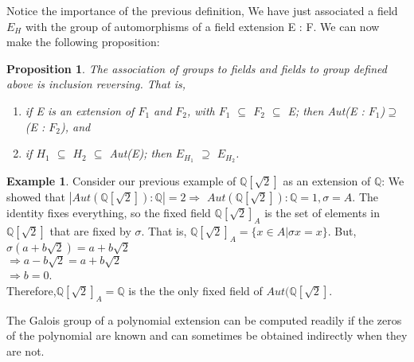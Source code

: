 \documentclass[12pt]{article}
\newtheorem{prop}[thm]{Proposition}
\theoremstyle{definition}
\newtheorem{exmp}[thm]{Example}
\theoremstyle{remark}
\begin{document}
Notice the importance of the previous definition, We have just associated a field $E_{H}$ with the group of automorphisms of a field extension E : F. We can now make the following proposition:

\begin{prop}
The association of groups to fields and fields to group defined above is inclusion reversing.
That is,
\begin{enumerate}
\item if E is an extension of $F_{1}$ and $F_{2}$, with $F_{1}$ $\subseteq$ $F_{2}$ $\subseteq$ E; then Aut(E : $F_{1}$)$\supseteq$(E : $F_{2}$), and
 \item if $H_{1}$ $\subseteq$ $H_{2}$ $\subseteq$ Aut(E); then $E_{H_{1}}$ $\supseteq$ $E_{H_{2}}$.
\end{enumerate}
\end{prop}

\begin{exmp}
Consider our previous example of $\mathbb{Q}[\sqrt{2}]$ as an extension of $\mathbb{Q}$: We showed that $|Aut(\mathbb{Q}[\sqrt{2}]):\mathbb{Q}|=2 \Rightarrow$ $Aut(\mathbb{Q}[\sqrt{2}]):\mathbb{Q}={1,\sigma}=A$.  The identity fixes everything, so the fixed field $\mathbb{Q}[\sqrt{2}]_{A}$ is the set of elements in $\mathbb{Q}[\sqrt{2}] $ that are fixed by $\sigma$. That is, $\mathbb{Q}[\sqrt{2}]_{A} =\{x\in A|  \sigma x = x\}$. But,\\
      $\sigma (a+b \sqrt {2})=a+b \sqrt {2}$\\
      $\Rightarrow  a-b \sqrt {2}=a+b \sqrt {2}$\\
      $\Rightarrow b=0$.\\
Therefore,$\mathbb{Q}[\sqrt{2}]_{A}=\mathbb{Q}$ is the the only fixed field of $Aut(\mathbb{Q}[\sqrt{2}]$.
\end{exmp}
The Galois group of a polynomial extension can be computed readily if the zeros of the polynomial are known and can sometimes be obtained indirectly when they are not.
\end{document}
